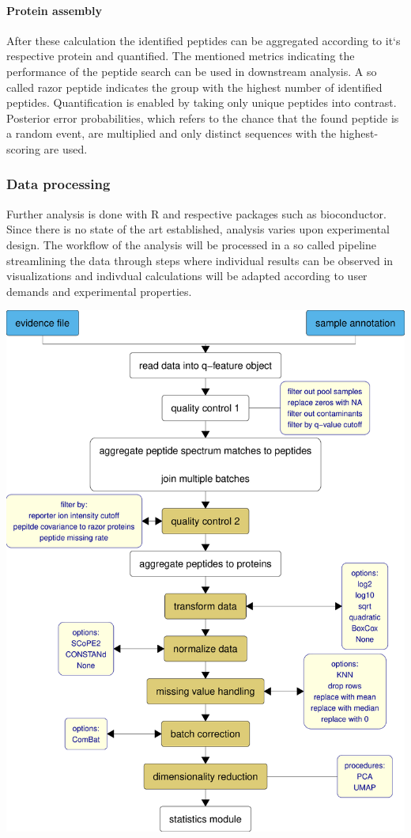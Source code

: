 \documentclass[
  11pt,
]{article}
\begin{document}
\hypertarget{protein-assembly}{%
\paragraph{Protein assembly}\label{protein-assembly}}

After these calculation the identified peptides can be aggregated
according to it`s respective protein and quantified. The mentioned
metrics indicating the performance of the peptide search can be used in
downstream analysis. A so called razor peptide indicates the group with
the highest number of identified peptides. Quantification is enabled by
taking only unique peptides into contrast. Posterior error
probabilities, which refers to the chance that the found peptide is a
random event, are multiplied and only distinct sequences with the
highest-scoring are used.

\hypertarget{data-processing}{%
\subsubsection{Data processing}\label{data-processing}}

Further analysis is done with R and respective packages such as
bioconductor. Since there is no state of the art established, analysis
varies upon experimental design. The workflow of the analysis will be
processed in a so called pipeline streamlining the data through steps
where individual results can be observed in visualizations and indivdual
calculations will be adapted according to user demands and experimental
properties.

\includegraphics{Thesis_files/figure-latex/data_processing_pipeline_flowchart_vertical-1.pdf}
\end{document}
